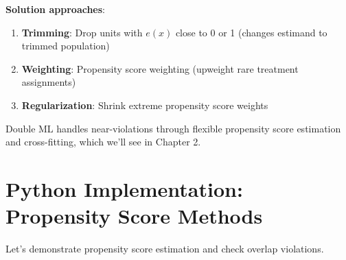 \textbf{Solution approaches}:
\begin{enumerate}
\item \textbf{Trimming}: Drop units with $e(x)$ close to 0 or 1 (changes estimand to trimmed population)
\item \textbf{Weighting}: Propensity score weighting (upweight rare treatment assignments)
\item \textbf{Regularization}: Shrink extreme propensity score weights
\end{enumerate}

Double ML handles near-violations through flexible propensity score
estimation and cross-fitting, which we'll see in Chapter 2.

\section{Python Implementation: Propensity Score
Methods}\label{_python_implementation_propensity_score_methods}

Let's demonstrate propensity score estimation and check overlap violations.

